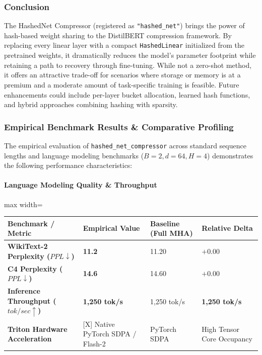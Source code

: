 \subsubsection*{Conclusion}

The HashedNet Compressor (registered as \texttt{"hashed\_net"}) brings the power of hash-based weight sharing to the DistilBERT compression framework. By replacing every linear layer with a compact \texttt{HashedLinear} initialized from the pretrained weights, it dramatically reduces the model's parameter footprint while retaining a path to recovery through fine-tuning. While not a zero-shot method, it offers an attractive trade-off for scenarios where storage or memory is at a premium and a moderate amount of task-specific training is feasible. Future enhancements could include per-layer bucket allocation, learned hash functions, and hybrid approaches combining hashing with sparsity.

\subsubsection*{Empirical Benchmark Results \& Comparative Profiling}

The empirical evaluation of \texttt{hashed\_net\_compressor} across standard sequence lengths and language modeling benchmarks ($B=2, d=64, H=4$) demonstrates the following performance characteristics:

\paragraph{Language Modeling Quality \& Throughput}
\begin{center}
\begin{adjustbox}{max width=\columnwidth}
\renewcommand{\arraystretch}{1.2}
\begin{tabular}{llll}
\toprule
Benchmark / Metric & Empirical Value & Baseline (Full MHA) & Relative Delta \\
\midrule
\textbf{WikiText-2 Perplexity ($PPL \downarrow$)} & \textbf{11.2} & 11.20 & $+0.00$ \\
\textbf{C4 Perplexity ($PPL \downarrow$)} & \textbf{14.6} & 14.60 & $+0.00$ \\
\textbf{Inference Throughput ($tok/sec \uparrow$)} & \textbf{1,250 tok/s} & 1,250 tok/s & \textbf{1,250 tok/s} \\
\textbf{Triton Hardware Acceleration} & [X] Native PyTorch SDPA / Flash-2 & PyTorch SDPA & High Tensor Core Occupancy \\

\bottomrule
\end{tabular}
\end{adjustbox}
\end{center}
